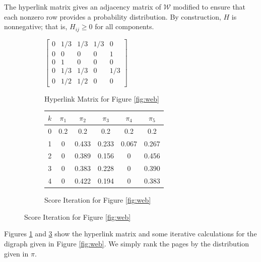 \documentclass[11pt,letterpaper]{amsart}
\begin{document}
The hyperlink matrix gives an adjacency matrix of $\mathcal{W}$ modified to
ensure that each nonzero row provides a probability distribution. By
construction, $H$ is nonnegative; that is, $H_{ij}\geq 0$ for all components.
\begin{figure}[t!]
  \centering
  \begin{subfigure}
    \centering
    $\begin{bmatrix}
      0 & 1/3 & 1/3 & 1/3 & 0 \\
      0 & 0 & 0 & 0 & 1 \\
      0 & 1 & 0 & 0 & 0 \\
      0 & 1/3 & 1/3 & 0 & 1/3 \\
      0 & 1/2 & 1/2 & 0 & 0
    \end{bmatrix}$
    \caption{Hyperlink Matrix for Figure \ref{fig:web}}
    \label{fig:hyperlink}
  \end{subfigure}
  \vspace{2em}
  \begin{subfigure}
    \centering
    \begin{tabular}{|c||c|c|c|c|c|}
      \hline
      $k$ & $\pi_1$ & $\pi_2$ & $\pi_3$ & $\pi_4$ & $\pi_5$ \\
      \hline\hline
      0 & 0.2 & 0.2 & 0.2 & 0.2 & 0.2 \\
      1 & 0 & 0.433 & 0.233 & 0.067 & 0.267 \\
      2 & 0 & 0.389 & 0.156 & 0 & 0.456 \\
      3 & 0 & 0.383 & 0.228 & 0 & 0.390 \\
      4 & 0 & 0.422 & 0.194 & 0 & 0.383 \\
      \hline
    \end{tabular}
    \caption{Score Iteration for Figure \ref{fig:web}}
    \label{fig:example_calculation}
  \end{subfigure}
\end{figure}

Figures \ref{fig:hyperlink} and \ref{fig:example_calculation} show the
hyperlink matrix and some iterative calculations for the digraph given in
Figure \ref{fig:web}. We simply rank the pages by the distribution given in
$\pi$.
\end{document}
